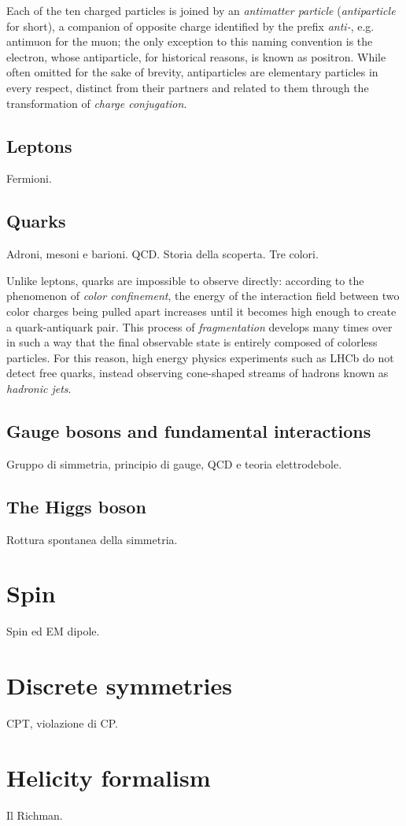 Each of the ten charged particles is joined by an \textit{antimatter particle} (\textit{antiparticle} for short), a companion of opposite charge identified by the prefix \textit{anti-}, e.g. antimuon for the muon; the only exception to this naming convention is the electron, whose antiparticle, for historical reasons, is known as positron. While often omitted for the sake of brevity, antiparticles are elementary particles in every respect, distinct from their partners and related to them through the transformation of \textit{charge conjugation}.

\subsection{Leptons}
Fermioni.

\subsection{Quarks}
Adroni, mesoni e barioni. QCD. Storia della scoperta. Tre colori.

Unlike leptons, quarks are impossible to observe directly: according to the phenomenon of \textit{color confinement}, the energy of the interaction field between two color charges being pulled apart increases until it becomes high enough to create a quark-antiquark pair. This process of \textit{fragmentation} develops many times over in such a way that the final observable state is entirely composed of colorless particles. For this reason, high energy physics experiments such as LHCb do not detect free quarks, instead observing cone-shaped streams of hadrons known as \textit{hadronic jets}.

\subsection{Gauge bosons and fundamental interactions}
Gruppo di simmetria, principio di gauge, QCD e teoria elettrodebole.

\subsection{The Higgs boson}
Rottura spontanea della simmetria.

\section{Spin}
Spin ed EM dipole.

\section{Discrete symmetries}
CPT, violazione di CP.

\section{Helicity formalism}
Il Richman.